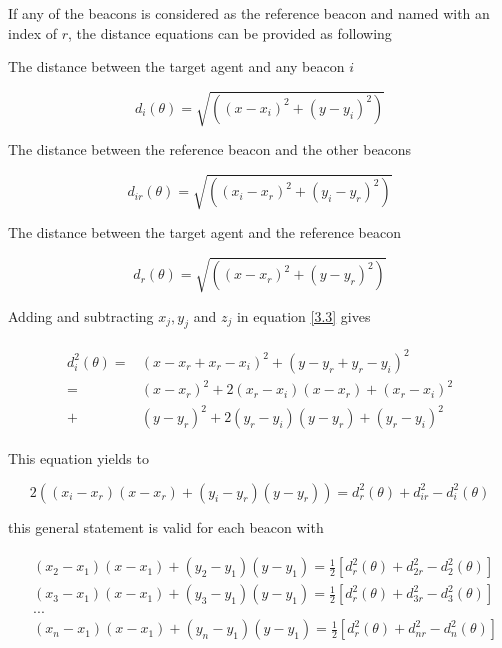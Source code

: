 If any of the beacons is considered as the reference beacon and named with an index of $r$, the distance equations can be provided as following

The distance between the target agent and any beacon $i$

\begin{equation} \label{3.3}
d_i(\theta) = \sqrt{\left((x - x_i)^2 + (y - y_i)^2\right)}
\end{equation}

The distance between the reference beacon and the other beacons

\begin{equation}
d_{ir}(\theta) = \sqrt{\left((x_i - x_r)^2 + (y_i - y_r)^2\right)}
\end{equation}

The distance between the target agent and the reference beacon

\begin{equation}
d_r(\theta) = \sqrt{\left((x - x_r)^2 + (y - y_r)^2\right)}
\end{equation}

Adding and subtracting $x_j, y_j$ and $z_j$ in equation \ref{3.3} gives

\begin{align}
\begin{split}
d_i^2(\theta) = & (x - x_r + x_r - x_i)^2 + (y - y_r + y_r - y_i)^2 \\ 
              = & (x - x_r)^2 + 2(x_r - x_i)(x - x_r) + (x_r-x_i)^2 \\
              + & (y - y_r)^2 + 2(y_r - y_i)(y - y_r) + (y_r - y_i)^2
\end{split}
\end{align}

This equation yields to

\begin{equation}
 2((x_i - x_r)(x - x_r) + (y_i - y_r)(y - y_r)) = d_r^2(\theta) + d_{ir}^2 - d_i^2(\theta)
\end{equation}

this general statement is valid for each beacon with

\begin{align}
\begin{split}
& (x_2 - x_1)(x - x_1) + (y_2 - y_1)(y - y_1) = \frac{1}{2} [d_r^2(\theta) + d_{2r}^2 - d_2^2(\theta)] \\
& (x_3 - x_1)(x - x_1) + (y_3 - y_1)(y - y_1) = \frac{1}{2} [d_r^2(\theta) + d_{3r}^2 - d_3^2(\theta)] \\
& ... \\
& (x_n - x_1)(x - x_1) + (y_n - y_1)(y - y_1) = \frac{1}{2} [d_r^2(\theta) + d_{nr}^2 - d_n^2(\theta)]
\end{split}
\end{align}

